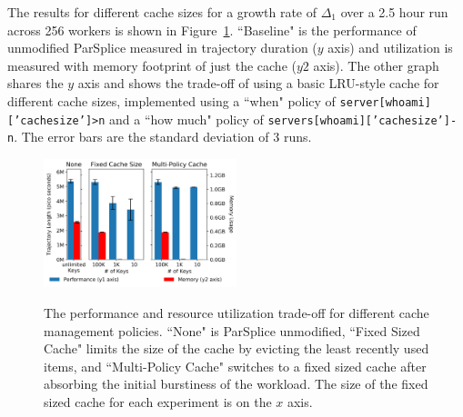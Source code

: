 The results for different cache sizes for a growth rate of \(\Delta_1\) over a
2.5 hour run across 256 workers is shown in
Figure~\ref{fig:methodology-tradeoff}.  ``Baseline" is the performance of
unmodified ParSplice  measured in trajectory duration (\(y\) axis) and
utilization is measured with memory footprint of just the cache (\(y2\) axis).
The other graph shares the \(y\) axis and shows the trade-off of using a basic
LRU-style cache for different cache sizes, implemented using a ``when" policy
of \texttt{server[whoami]['cachesize']>n} and a ``how much" policy of
\texttt{servers[whoami]['cachesize']-n}. The error bars are the standard
deviation of 3 runs. 



\begin{figure}[t]
\noindent\includegraphics[width=0.5\textwidth]{figures/methodology-tradeoff.png}\\

\caption{The performance and resource utilization trade-off for different cache
management policies. ``None" is ParSplice unmodified, ``Fixed Sized Cache"
limits the size of the cache by evicting the least recently used items, and
``Multi-Policy Cache" switches to a fixed sized cache after absorbing the
initial burstiness of the workload.  The size of the fixed sized cache for each
experiment is on the \(x\) axis.  \label{fig:methodology-tradeoff}}
\end{figure}
%
%

